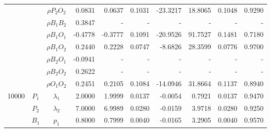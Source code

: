 \documentclass[letterpaper]{article}
\begin{document}
\begin{table}[h]
\begin{tabular}{cccrrrrrrr}
            &             & $\rho{P_2O_2}$ & 0.0831                 & 0.0637                 & 0.1031                 & -23.3217               & 18.8065                & 0.1048                   & 0.9290                 \\
            &             & $\rho{B_1B_2}$ & 0.3847                 & -                      & -                      & -                      & -                      & -                        & -                      \\
            &             & $\rho{B_1O_1}$ & -0.4778                & -0.3777                & 0.1091                 & -20.9526               & 91.7527                & 0.1481                   & 0.7180                 \\
            &             & $\rho{B_1O_2}$ & 0.2440                 & 0.2228                 & 0.0747                 & -8.6826                & 28.3599                & 0.0776                   & 0.9700                 \\
            &             & $\rho{B_2O_1}$ & -0.0941                & -                      & -                      & -                      & -                      & -                        & -                      \\
            &             & $\rho{B_2O_2}$ & 0.2622                 & -                      & -                      & -                      & -                      & -                        & -                      \\
            &             & $\rho{O_1O_2}$ & 0.2451                 & 0.2105                 & 0.1084                 & -14.0946               & 31.8664                & 0.1137                   & 0.8940                 \\\hline
10000       & $P_1$       & $\lambda_1$    & 2.0000                 & 1.9999                 & 0.0137                 & -0.0054                & 0.7921                 & 0.0137                   & 0.9470                 \\
            & $P_2$       & $\lambda_2$    & 7.0000                 & 6.9989                 & 0.0280                 & -0.0159                & 3.9718                 & 0.0280                   & 0.9250                 \\
            & $B_1$       & $p_1$          & 0.8000                 & 0.7999                 & 0.0040                 & -0.0165                & 3.2905                 & 0.0040                   & 0.9570                 \\

\end{tabular}
\end{table}
\end{document}
